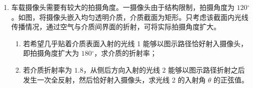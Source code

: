 \documentclass[\gkver]{gaokaozhenti}
\begin{document}
\begin{enumerate}
{（3）图 4 中螺旋测微器读数为 $11 \Umm + 35.0 \times 0.01 \Umm = 11.350 \Umm$。

（4）数据如上表所示。

（5）根据表格中数据，在图 5 中描出第 4、5 组测量数据的坐标点，并作出 $z-U$ 图像，如图所示

\onepicture[w=8.21cm]{}

（6）根据图像可知，电压表示数为 $20 \UmV$ 时，有 $z_{1} = 12.15 \Umm$，移动后电压表示数为 $60 \UmV$ 时，有 $z_{2} = 13.70 \Umm$，则此过程中物体位移的大小为 $z = z_{2} - z_{1} = 1.55 \Umm$。
}
\item
车载摄像头需要有较大的拍摄角度。一摄像头由于结构限制，拍摄角度为 $120{^\circ}$。如图，将摄像头嵌入均匀透明介质，介质截面为矩形。只考虑该截面内光线传播情况，通过空气与介质间界面的折射，可将实际拍摄角度扩大。
\begin{enumerate}
	\item
	若希望几乎贴着介质表面入射的光线 1 能够以图示路径恰好射入摄像头，即拍摄角度扩大为 $180{^\circ}$，求介质的折射率；
	\item
	若介质折射率为 $1.8$，从侧后方向入射的光线 2 能够以图示路径折射之后发生一次全反射，然后恰好射入摄像头，求光线 2 的入射角 $\theta$ 的正弦值。
\end{enumerate}
\onepicture[align=right, w=11.38cm]{}
\end{enumerate}
\end{document}
